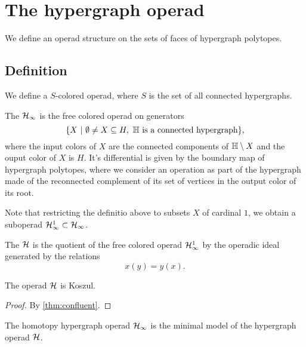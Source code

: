 
\section{The hypergraph operad} 
\label{s:hyperoperad}

We define an operad structure on the sets of faces of hypergraph polytopes.


\subsection{Definition}

We define a $S$-colored operad, where $S$ is the set of all connected hypergraphs.

\begin{definition}
  The  $\mathcal{H}_\infty$ is the free colored operad on generators 
  $$\{ X \ | \ \emptyset \neq X \subseteq H , \ \hyper{H} \text{ is a connected hypergraph}\},$$
where the input colors of $X$ are the connected components of ${\mathbb H}\setminus X$ and the ouput color of $X$ is $H$.
It's differential is given by the boundary map of hypergraph polytopes, where we consider an operation as part of the hypergraph made of the reconnected complement of its set of vertices in the output color of its root. 
\end{definition}


Note that restricting the definitio above to subsets $X$ of cardinal $1$, we obtain a suboperad $\mathcal{H}_\infty^1 \subset \mathcal{H}_\infty$. 

\begin{definition}
  The  $\mathcal{H}$ is the quotient of the free colored operad $\mathcal{H}_\infty^1$ by the operadic ideal generated by the relations $$x(y)=y(x).$$
\end{definition}

\begin{thm}
  The operad $\mathcal{H}$ is Koszul.
\end{thm}

\begin{proof}
  By \cref{thm:confluent}.
\end{proof}

\begin{thm}
  The homotopy hypergraph operad $\mathcal{H}_\infty$ is the minimal model of the hypergraph operad $\mathcal{H}$.
\end{thm}

